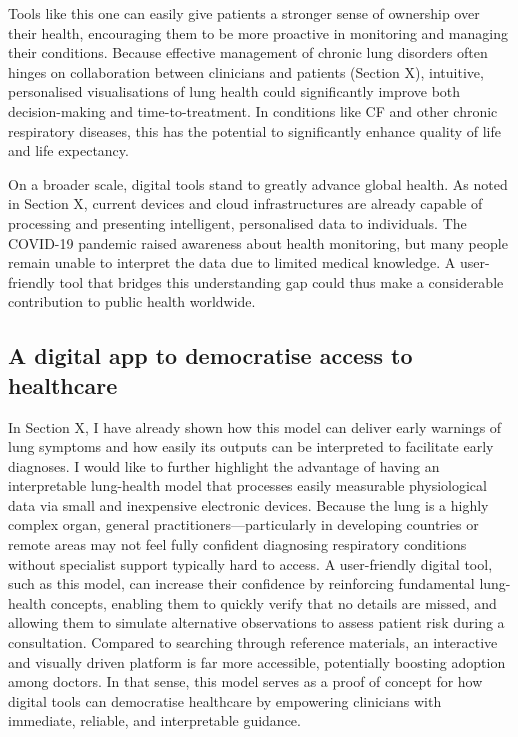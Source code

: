 Tools like this one can easily give patients a stronger sense of ownership over their health, encouraging them to be more proactive in monitoring and managing their conditions. Because effective management of chronic lung disorders often hinges on collaboration between clinicians and patients (Section X), intuitive, personalised visualisations of lung health could significantly improve both decision-making and time-to-treatment. In conditions like CF and other chronic respiratory diseases, this has the potential to significantly enhance quality of life and life expectancy.

On a broader scale, digital tools stand to greatly advance global health. As noted in Section X, current devices and cloud infrastructures are already capable of processing and presenting intelligent, personalised data to individuals. The COVID-19 pandemic raised awareness about health monitoring, but many people remain unable to interpret the data due to limited medical knowledge. A user-friendly tool that bridges this understanding gap could thus make a considerable contribution to public health worldwide.

\subsection{A digital app to democratise access to healthcare}
In Section X, I have already shown how this model can deliver early warnings of lung symptoms and how easily its outputs can be interpreted to facilitate early diagnoses. I would like to further highlight the advantage of having an interpretable lung-health model that processes easily measurable physiological data via small and inexpensive electronic devices. Because the lung is a highly complex organ, general practitioners—particularly in developing countries or remote areas may not feel fully confident diagnosing respiratory conditions without specialist support typically hard to access. A user-friendly digital tool, such as this model, can increase their confidence by reinforcing fundamental lung-health concepts, enabling them to quickly verify that no details are missed, and allowing them to simulate alternative observations to assess patient risk during a consultation. Compared to searching through reference materials, an interactive and visually driven platform is far more accessible, potentially boosting adoption among doctors. In that sense, this model serves as a proof of concept for how digital tools can democratise healthcare by empowering clinicians with immediate, reliable, and interpretable guidance.

